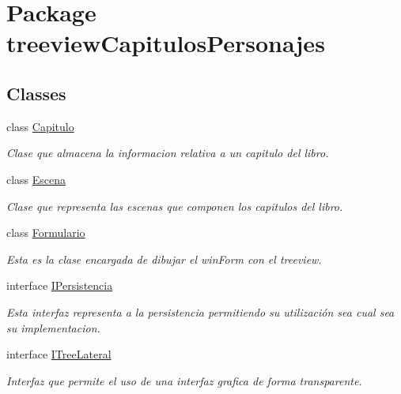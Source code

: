 \hypertarget{namespacetreeview_capitulos_personajes}{\section{Package treeview\-Capitulos\-Personajes}
\label{namespacetreeview_capitulos_personajes}
}
\subsection*{Classes}
\begin{DoxyCompactItemize}
\item 
class \hyperlink{classtreeview_capitulos_personajes_1_1_capitulo}{Capitulo}
\begin{DoxyCompactList}\small\item\em Clase que almacena la informacion relativa a un capitulo del libro. \end{DoxyCompactList}\item 
class \hyperlink{classtreeview_capitulos_personajes_1_1_escena}{Escena}
\begin{DoxyCompactList}\small\item\em Clase que representa las escenas que componen los capitulos del libro. \end{DoxyCompactList}\item 
class \hyperlink{classtreeview_capitulos_personajes_1_1_formulario}{Formulario}
\begin{DoxyCompactList}\small\item\em Esta es la clase encargada de dibujar el win\-Form con el treeview. \end{DoxyCompactList}\item 
interface \hyperlink{interfacetreeview_capitulos_personajes_1_1_i_persistencia}{I\-Persistencia}
\begin{DoxyCompactList}\small\item\em Esta interfaz representa a la persistencia permitiendo su utilización sea cual sea su implementacion. \end{DoxyCompactList}\item 
interface \hyperlink{interfacetreeview_capitulos_personajes_1_1_i_tree_lateral}{I\-Tree\-Lateral}
\begin{DoxyCompactList}\small\item\em Interfaz que permite el uso de una interfaz grafica de forma transparente. \end{DoxyCompactList}\item 

\end{DoxyCompactItemize}
